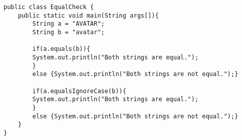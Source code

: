 
\java
\begin{lstlisting}[frame=single, caption={Compare Two Strings}]
public class EqualCheck {
	public static void main(String args[]){
		String a = "AVATAR";
		String b = "avatar";
		
		if(a.equals(b)){
		System.out.println("Both strings are equal.");
		} 
		else {System.out.println("Both strings are not equal.");}
	
		if(a.equalsIgnoreCase(b)){
		System.out.println("Both strings are equal.");
		} 
		else {System.out.println("Both strings are not equal.");}
	}
}

\end{lstlisting}